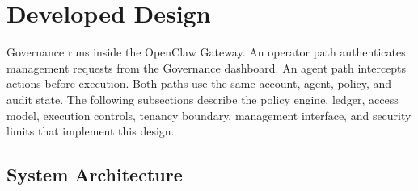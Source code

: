 \section{Developed Design}
\label{sec:gov-developed}

{\color{red}Governance runs inside the OpenClaw Gateway. An
operator path authenticates management requests from the Governance dashboard.
An agent path intercepts actions before execution. Both paths use the
same account, agent, policy, and audit state. The following subsections describe
the policy engine, ledger, access model, execution controls, tenancy boundary,
management interface, and security limits that implement this design.}


\subsection{System Architecture}
\label{sec:gov-arch}
